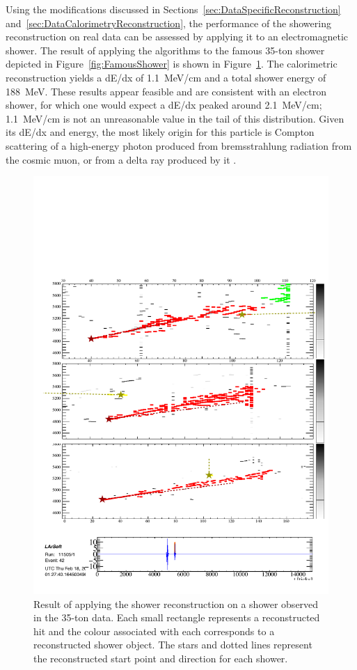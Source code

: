 Using the modifications discussed in Sections~\ref{sec:DataSpecificReconstruction} and~\ref{sec:DataCalorimetryReconstruction}, the performance of the showering reconstruction on real data can be assessed by applying it to an electromagnetic shower.  The result of applying the algorithms to the famous 35-ton shower depicted in Figure~\ref{fig:FamousShower} is shown in Figure~\ref{fig:FamousShowerReconstructed}.  The calorimetric reconstruction yields a dE/dx of 1.1~MeV/cm and a total shower energy of 188~MeV.  These results appear feasible and are consistent with an electron shower, for which one would expect a dE/dx peaked around 2.1~MeV/cm; 1.1~MeV/cm is not an unreasonable value in the tail of this distribution.  Given its dE/dx and energy, the most likely origin for this particle is Compton scattering of a high-energy photon produced from bremsstrahlung radiation from the cosmic muon, or from a delta ray produced by it \cite{MicroBooNECosmics2016}.

\begin{figure}
  \centering
  \includegraphics[width=12cm]{FamousShowerReconstructed.pdf}
  \caption[Result of applying the shower reconstruction on a shower observed in the 35-ton data.]{Result of applying the shower reconstruction on a shower observed in the 35-ton data.  Each small rectangle represents a reconstructed hit and the colour associated with each corresponds to a reconstructed shower object.  The stars and dotted lines represent the reconstructed start point and direction for each shower.}
  \label{fig:FamousShowerReconstructed}
\end{figure}

